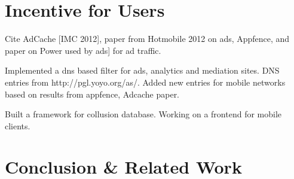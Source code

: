 \documentclass{sig-alternate-10pt}
\begin{document}
\section{Incentive for Users}

Cite AdCache [IMC 2012], paper from Hotmobile 2012 on ads,  Appfence,
and paper on Power used by ads] for ad traffic. 

Implemented a dns based filter for ads, analytics and mediation sites.
DNS entries from http://pgl.yoyo.org/as/. Added new entries for
mobile networks based on results from appfence, Adcache paper.

Built a framework for collusion database. Working on a frontend for
mobile clients. 

\section{Conclusion \& Related Work}



\scriptsize


\normalsize
\end{document}
